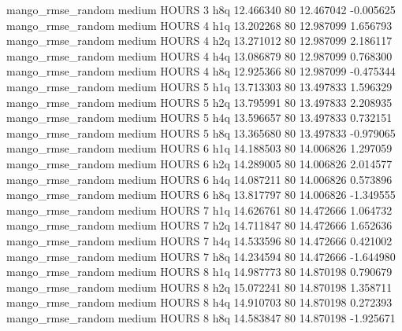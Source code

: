mango_rmse_random     medium    HOURS                 3                  h8q 12.466340 80      12.467042          -0.005625
mango_rmse_random     medium    HOURS                 4                  h1q 13.202268 80      12.987099           1.656793
mango_rmse_random     medium    HOURS                 4                  h2q 13.271012 80      12.987099           2.186117
mango_rmse_random     medium    HOURS                 4                  h4q 13.086879 80      12.987099           0.768300
mango_rmse_random     medium    HOURS                 4                  h8q 12.925366 80      12.987099          -0.475344
mango_rmse_random     medium    HOURS                 5                  h1q 13.713303 80      13.497833           1.596329
mango_rmse_random     medium    HOURS                 5                  h2q 13.795991 80      13.497833           2.208935
mango_rmse_random     medium    HOURS                 5                  h4q 13.596657 80      13.497833           0.732151
mango_rmse_random     medium    HOURS                 5                  h8q 13.365680 80      13.497833          -0.979065
mango_rmse_random     medium    HOURS                 6                  h1q 14.188503 80      14.006826           1.297059
mango_rmse_random     medium    HOURS                 6                  h2q 14.289005 80      14.006826           2.014577
mango_rmse_random     medium    HOURS                 6                  h4q 14.087211 80      14.006826           0.573896
mango_rmse_random     medium    HOURS                 6                  h8q 13.817797 80      14.006826          -1.349555
mango_rmse_random     medium    HOURS                 7                  h1q 14.626761 80      14.472666           1.064732
mango_rmse_random     medium    HOURS                 7                  h2q 14.711847 80      14.472666           1.652636
mango_rmse_random     medium    HOURS                 7                  h4q 14.533596 80      14.472666           0.421002
mango_rmse_random     medium    HOURS                 7                  h8q 14.234594 80      14.472666          -1.644980
mango_rmse_random     medium    HOURS                 8                  h1q 14.987773 80      14.870198           0.790679
mango_rmse_random     medium    HOURS                 8                  h2q 15.072241 80      14.870198           1.358711
mango_rmse_random     medium    HOURS                 8                  h4q 14.910703 80      14.870198           0.272393
mango_rmse_random     medium    HOURS                 8                  h8q 14.583847 80      14.870198          -1.925671
